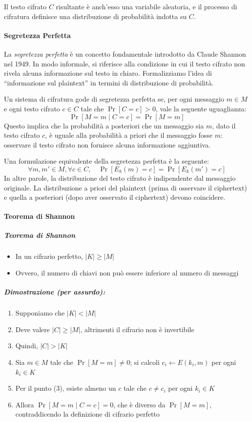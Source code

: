 \documentclass{article}
\begin{document}
  Il testo cifrato $C$ risultante è anch'esso una variabile aleatoria, e il processo di cifratura definisce una distribuzione di probabilità indotta su $C$.

  \paragraph{Segretezza Perfetta}

  La \textit{segretezza perfetta} è un concetto fondamentale introdotto da Claude Shannon nel 1949. In modo informale, si riferisce alla condizione in cui il testo cifrato non rivela alcuna informazione sul testo in chiaro. Formalizziamo l'idea di ``informazione sul plaintext'' in termini di distribuzione di probabilità.
  
  Un sistema di cifratura gode di segretezza perfetta se, per ogni messaggio $m \in M$ e ogni testo cifrato $c \in C$ tale che $\Pr[C = c] > 0$, vale la seguente uguaglianza:
  \[
  \Pr[M = m \mid C = c] = \Pr[M = m]
  \]
  Questo implica che la probabilità a posteriori che un messaggio sia $m$, dato il testo cifrato $c$, è uguale alla probabilità a priori che il messaggio fosse $m$: osservare il testo cifrato non fornisce alcuna informazione aggiuntiva.
  
  Una formulazione equivalente della segretezza perfetta è la seguente:
  \[
  \forall m, m' \in M, \forall c \in C, \quad \Pr[E_k(m) = c] = \Pr[E_k(m') = c]
  \]
  In altre parole, la distribuzione del testo cifrato è indipendente dal messaggio originale. La distribuzione a priori del plaintext (prima di osservare il ciphertext) e quella a posteriori (dopo aver osservato il ciphertext) devono coincidere.
  
  \paragraph{Teorema di Shannon}

  \subparagraph{Teorema di Shannon}
  \begin{itemize}
      \item In un cifrario perfetto, $|K| \geq |M|$
      \item Ovvero, il numero di chiavi non può essere inferiore al numero di messaggi
  \end{itemize}
  
  \subparagraph{Dimostrazione (per assurdo):}
  \begin{enumerate}
      \item Supponiamo che $|K| < |M|$
      \item Deve valere $|C| \geq |M|$, altrimenti il cifrario non è invertibile
      \item Quindi, $|C| > |K|$
      \item Sia $m \in M$ tale che $\Pr[M = m] \neq 0$; si calcoli $c_i \leftarrow E(k_i, m)$ per ogni $k_i \in K$
      \item Per il punto (3), esiste almeno un $c$ tale che $c \neq c_i$ per ogni $k_i \in K$
      \item Allora $\Pr[M = m \mid C = c] = 0$, che è diverso da $\Pr[M = m]$, contraddicendo la definizione di cifrario perfetto
  \end{enumerate}
  
\end{document}

